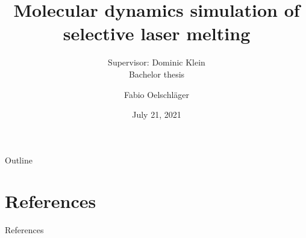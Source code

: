\documentclass[fleqn]{presentation}
\title[MD simulation of SLM]{Molecular dynamics simulation of selective laser melting}
\subtitle{
	Supervisor: Dominic Klein\\
	Bachelor thesis}
\author{Fabio Oelschläger}
\date{July 21, 2021}
\begin{document}
\begin{frame}
	\maketitle
\end{frame}


\begin{frame}{Outline}
	\tableofcontents
\end{frame}







\section*{References}
\begin{frame}{References}
	\nocite{horsch20143d}
	
\end{frame}
\end{document}
